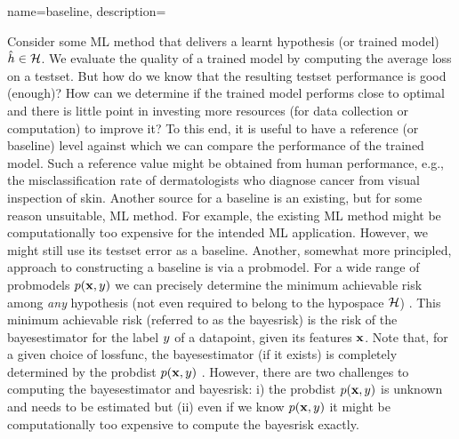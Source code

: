 {name={baseline},
    description={Consider some ML method that delivers a learnt \gls{hypothesis} (or trained \gls{model}) 
    $\hat{h} \in \mathcal{H}$. We evaluate the quality of a trained \gls{model} 
    by computing the average \gls{loss} on a \gls{testset}. But how do we know that the resulting 
    \gls{testset} performance is good (enough)? How can we determine if the trained \gls{model} performs 
    close to optimal and there is little point in investing more resources (for \gls{data} collection 
	or computation) to improve it? To this end, it is useful to have a reference (or baseline) level 
    against which we can compare the performance of the trained \gls{model}. 
    Such a reference value might be obtained from human performance, e.g., the misclassification
    rate of dermatologists who diagnose cancer from visual inspection of skin. Another 
    source for a baseline is an existing, but for some reason unsuitable, ML method. 
    For example, the existing ML method might be computationally too expensive for 
    the intended ML application. However, we might still use its \gls{testset} error 
    as a baseline. Another, somewhat more principled, approach to constructing a 
    baseline is via a \gls{probmodel}. For a wide range of \gls{probmodel}s $p({\bf x},y)$ 
    we can precisely determine the minimum achievable \gls{risk} among \emph{any} \gls{hypothesis} (not even 
    required to belong to the \gls{hypospace} $\mathcal{H}$) \cite{LC}. 
    This minimum achievable \gls{risk} (referred to as the \gls{bayesrisk}) is the \gls{risk} 
    of the \gls{bayesestimator} for the \gls{label} $y$ of a \gls{datapoint}, given
    its \gls{feature}s ${\bf x}$. Note that, for a given choice of \gls{lossfunc}, the 
    \gls{bayesestimator} (if it exists) is completely determined by the \gls{probdist} $p({\bf x},y)$ \cite[Chapter 4]{LC}. 
    However, there are two challenges to computing the \gls{bayesestimator} and \gls{bayesrisk}:
    i) the \gls{probdist} $p({\bf x},y)$ is unknown and needs to be estimated 
    but (ii) even if we know $p({\bf x},y)$ it might be computationally too expensive  
	to compute the \gls{bayesrisk} exactly. 
	\begin{figure}[h]
		\begin{center}
\end{center}
\end{figure}}}
